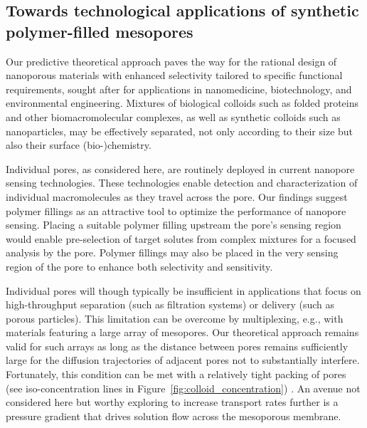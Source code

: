 \documentclass[12pt, a4paper]{article}
\begin{document}
\subsection[Towards technological applications of synthetic polymer-filled mesopores]{Towards technological applications of synthetic \\ polymer-filled mesopores}

Our predictive theoretical approach paves the way for the rational design of nanoporous materials with enhanced selectivity tailored to specific functional requirements, sought after for applications in nanomedicine, biotechnology, and environmental engineering.
Mixtures of biological colloids such as folded proteins and other biomacromolecular complexes, as well as synthetic colloids such as nanoparticles, may be effectively separated, not only according to their size but also their surface (bio-)chemistry.

Individual pores, as considered here, are routinely deployed in current nanopore sensing technologies.
These technologies enable detection and characterization of individual macromolecules as they travel across the pore.
Our findings suggest polymer fillings as an attractive tool to optimize the performance of nanopore sensing.
Placing a suitable polymer filling upstream the pore's sensing region would enable pre-selection of target solutes from complex mixtures for a focused analysis by the pore.
Polymer fillings may also be placed in the very sensing region of the pore to enhance both selectivity and sensitivity.

Individual pores will though typically be insufficient in applications that focus on high-throughput separation (such as filtration systems) or delivery (such as porous particles).
This limitation can be overcome by multiplexing, e.g., with materials featuring a large array of mesopores.
Our theoretical approach remains valid for such arrays as long as the distance between pores remains sufficiently large for the diffusion trajectories of adjacent pores not to substantially interfere.
Fortunately, this condition can be met with a relatively tight packing of pores (see iso-concentration lines in Figure~\ref{fig:colloid_concentration}) \cite{Fabrikant1985}.
An avenue not considered here but worthy exploring to increase transport rates further is a pressure gradient that drives solution flow across the mesoporous membrane.

\bigskip

\end{document}
